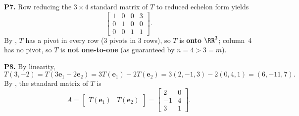 \documentclass[10pt]{scrartcl}
\newcommand{\vv}[1]{\mathbf{#1}}
\begin{document}
\begin{prob}\textbf{P7.}
Row reducing the $3\times 4$ standard matrix of $T$ to reduced echelon form yields
\[
  \begin{bmatrix} 1 & 0 & 0 & 3 \\ 0 & 1 & 0 & 0 \\ 0 & 0 & 1 & 1 \end{bmatrix}.
\]
By , $T$ has a pivot in every row ($3$ pivots in $3$ rows), so $T$ is \textbf{onto} $\RR^3$; column~4 has no pivot, so $T$ is \textbf{not one-to-one} (as guaranteed by $n=4>3=m$).
\end{prob}

\begin{prob}\textbf{P8.}
By linearity,
\[
  T(3,-2)=T(3\vv e_1-2\vv e_2)=3T(\vv e_1)-2T(\vv e_2)=3(2,-1,3)-2(0,4,1)=(6,-11,7).
\] By , the standard matrix of $T$ is
\[
  A = \begin{bmatrix} T(\vv e_1) & T(\vv e_2) \end{bmatrix} = \begin{bmatrix} 2 & 0 \\ -1 & 4 \\ 3 & 1 \end{bmatrix}.
\]
\end{prob}
\end{document}
